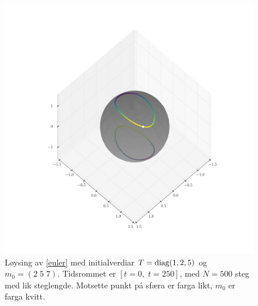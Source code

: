 \documentclass[12pt]{article}
\begin{document}
\begin{multicols*}{2}
\begin{figure}[H]
    \centering
    \includegraphics[width=\columnwidth]{euler}
    \caption{
        Løysing av \eqref{euler} med initialverdiar
        $T = \mathrm{diag} (1, 2, 5)$ og $m_0 = (2 \; 5 \; 7)$.
        Tidsrommet er $[t = 0,\; t = 250]$, med $N = 500$ steg
        med lik steglengde.
        Motsette punkt på sfæra er farga likt,
        $m_0$ er farga kvitt.
    }
\end{figure}







    \printbibliography


\end{multicols*}
\end{document}
